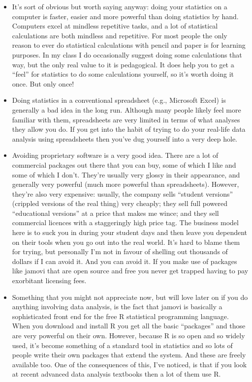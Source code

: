 \documentclass[
  a4paper,
]{book}
\providecommand{\tightlist}{%
  \setlength{\itemsep}{0pt}\setlength{\parskip}{0pt}}\usepackage{longtable,booktabs,array}
\begin{document}
\begin{itemize}
\tightlist
\item
  It's sort of obvious but worth saying anyway: doing your statistics on
  a computer is faster, easier and more powerful than doing statistics
  by hand. Computers excel at mindless repetitive tasks, and a lot of
  statistical calculations are both mindless and repetitive. For most
  people the only reason to ever do statistical calculations with pencil
  and paper is for learning purposes. In my class I do occasionally
  suggest doing some calculations that way, but the only real value to
  it is pedagogical. It does help you to get a ``feel'' for statistics
  to do some calculations yourself, so it's worth doing it once. But
  only once!
\item
  Doing statistics in a conventional spreadsheet (e.g., Microsoft Excel)
  is generally a bad idea in the long run. Although many people likely
  feel more familiar with them, spreadsheets are very limited in terms
  of what analyses they allow you do. If you get into the habit of
  trying to do your real-life data analysis using spreadsheets then
  you've dug yourself into a very deep hole.
\item
  Avoiding proprietary software is a very good idea. There are a lot of
  commercial packages out there that you can buy, some of which I like
  and some of which I don't. They're usually very glossy in their
  appearance, and generally very powerful (much more powerful than
  spreadsheets). However, they're also very expensive: usually, the
  company sells ``student versions'' (crippled versions of the real
  thing) very cheaply; they sell full powered ``educational versions''
  at a price that makes me wince; and they sell commercial licences with
  a staggeringly high price tag. The business model here is to suck you
  in during your student days and then leave you dependent on their
  tools when you go out into the real world. It's hard to blame them for
  trying, but personally I'm not in favour of shelling out thousands of
  dollars if I can avoid it. And you can avoid it. If you make use of
  packages like jamovi that are open source and free you never get
  trapped having to pay exorbitant licensing fees.
\item
  Something that you might not appreciate now, but will love later on if
  you do anything involving data analysis, is the fact that jamovi is
  basically a sophisticated front end for the free R statistical
  programming language. When you download and install R you get all the
  basic ``packages'' and those are very powerful on their own. However,
  because R is so open and so widely used, it's become something of a
  standard tool in statistics and so lots of people write their own
  packages that extend the system. And these are freely available too.
  One of the consequences of this, I've noticed, is that if you look at
  recent advanced data analysis textbooks then a lot of them use R.
\end{itemize}
\end{document}
